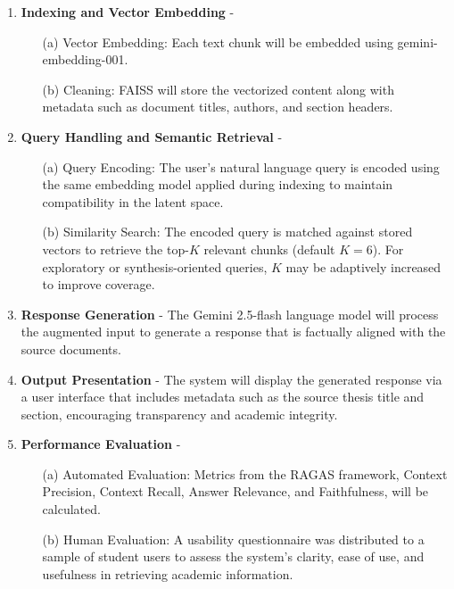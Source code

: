 \begin{refsection}
\begin{enumerate}
    \item \textbf{Indexing and Vector Embedding} - 
        \begin{enumerate}
            \item [(a)] {Vector Embedding:} Each text chunk will be embedded using gemini-embedding-001.
            \item [(b)] {Cleaning:} FAISS will store the vectorized content along with metadata such as document titles, authors, and section headers.
        \end{enumerate}

    \item \textbf{Query Handling and Semantic Retrieval} - 
        \begin{enumerate}
            \item [(a)] {Query Encoding:} The user’s natural language query is encoded using the same embedding model applied during indexing to maintain compatibility in the latent space.
            \item [(b)] {Similarity Search:} The encoded query is matched against stored vectors to retrieve the top-$K$ relevant chunks (default $K=6$). For exploratory or synthesis-oriented queries, $K$ may be adaptively increased to improve coverage.
        \end{enumerate}

    \item \textbf{Response Generation} - The Gemini 2.5-flash language model will process the augmented input to generate a response that is factually aligned with the source documents.

    \item \textbf{Output Presentation} - The system will display the generated response via a user interface that includes metadata such as the source thesis title and section, encouraging transparency and academic integrity.

    \item \textbf{Performance Evaluation} - 
        \begin{enumerate}
            \item [(a)] {Automated Evaluation:} Metrics from the RAGAS framework, Context Precision, Context Recall, Answer Relevance, and Faithfulness, will be calculated.
            \item [(b)] {Human Evaluation:} A usability questionnaire was distributed to a sample of student users to assess the system’s clarity, ease of use, and usefulness in retrieving academic information.
        \end{enumerate}


\end{enumerate}
\end{refsection}
